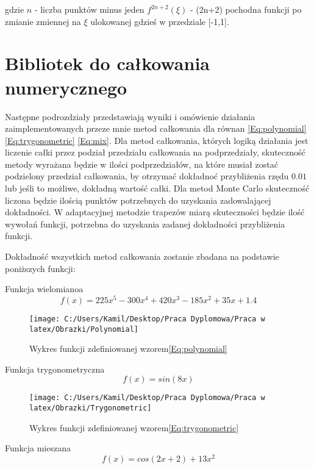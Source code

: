 \documentclass[12pt,twoside]{article}
\begin{document}
gdzie $n$ - liczba punktów minus jeden
$f^{2n+2}(\xi)$ - (2n+2) pochodna funkcji po zmianie zmiennej na $\xi$ ulokowanej gdzieś w przedziale [-1,1]. 


\section{Bibliotek do całkowania numerycznego}
Następne podrozdziały przedstawiają wyniki i omówienie działania zaimplementowanych przeze mnie metod całkowania dla równan \eqref{Eq:polynomial} \eqref{Eq:trygonometric} \eqref{Eq:mix}. Dla metod całkowania, których logiką działania jest liczenie całki przez podział przedziału całkowania na podprzedziały, skuteczność metody wyrażana będzie w ilości podprzedziałów, na które musiał zostać podzielony przedział całkowania, by otrzymać dokładnoć przybliżenia rzędu $0.01$ lub jeśli to możliwe, dokładną wartość całki.
Dla metod Monte Carlo skuteczność liczona będzie ilością punktów potrzebnych do uzyskania zadowalającej dokładności.
W adaptacyjnej metodzie trapezów miarą skuteczności będzie ilość wywołań funkcji, potrzebna do uzyskania zadanej dokładności przybliżenia funkcji.


Dokładność wszystkich metod całkowania zostanie zbadana na podstawie poniższych funkcji:

Funkcja wielomianoa
\begin{equation}
f(x) = 225x^5 - 300x^4 + 420x^3-185x^2+35x + 1.4
\label{Eq:polynomial}
\end{equation}

\begin{figure}
\texttt{[image: C:/Users/Kamil/Desktop/Praca Dyplomowa/Praca w latex/Obrazki/Polynomial]}
\caption{Wykres funkcji zdefiniowanej wzorem\eqref{Eq:polynomial}}
\end{figure}

Funkcja trygonometryczna
\begin{equation}
f(x) = sin(8x)
\label{Eq:trygonometric}
\end{equation}

\begin{figure}
\texttt{[image: C:/Users/Kamil/Desktop/Praca Dyplomowa/Praca w latex/Obrazki/Trygonometric]}
\caption{Wykres funkcji zdefiniowanej wzorem\eqref{Eq:trygonometric}}
\end{figure}

Funkcja mieszana
\begin{equation}
f(x) = cos(2x+2) + 13x^2
\label{Eq:mix}
\end{equation}
\end{document}
